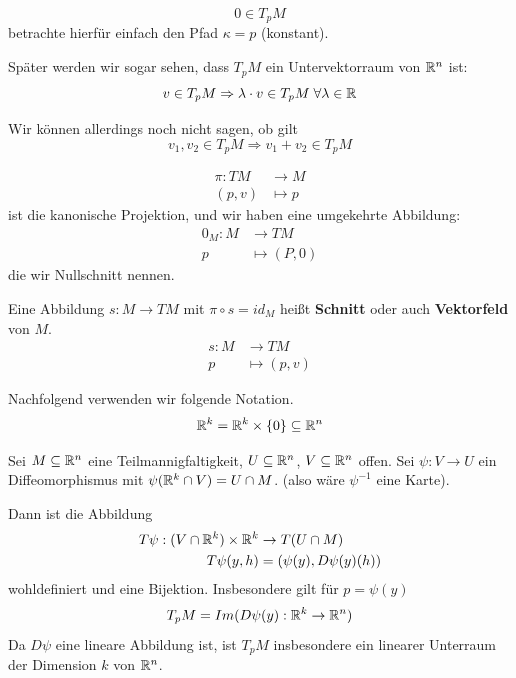 \documentclass[main.tex]{subfiles}
\begin{document}
\begin{Bemerkung}
  $$0 \in T_p M$$
  betrachte hierfür einfach den Pfad $\kappa = p$ (konstant).

  Später werden wir sogar sehen, dass $T_p M$ ein Untervektorraum von $\mathbb{R}^n$ ist:
  $$v \in T_p M \Rightarrow \lambda \cdot v \in T_p M \;\forall \lambda \in \mathbb{R}$$

  Wir können allerdings noch nicht sagen, ob gilt
  $$v_1, v_2\in T_p M \Rightarrow v_1 + v_2 \in T_p M$$
\end{Bemerkung}

\begin{Bemerkung}
  $$\begin{aligned}
    \pi: TM & \to M \\
    (p,v) & \mapsto p
  \end{aligned}$$
  ist die kanonische Projektion, und wir haben eine umgekehrte Abbildung:
  $$\begin{aligned}
    0_M: M & \to TM \\
    p & \mapsto (P,0)
  \end{aligned}$$
  die wir Nullschnitt nennen.
\end{Bemerkung}

\begin{Definition}[Vektorfeld]
  Eine Abbildung $s: M \to T M$ mit $\pi \circ s = id_M$ heißt \textbf{Schnitt} oder auch \textbf{Vektorfeld} von $M$.
  $$\begin{aligned}
    s: M & \to TM \\
    p & \mapsto (p,v)
  \end{aligned}$$
\end{Definition}

Nachfolgend verwenden wir folgende Notation.
$$\mathbb{R}^k = \mathbb{R}^k \times \{0\} \subseteq \mathbb{R}^n$$

\begin{Theorem}
  Sei $M \subseteq \mathbb{R}^n$ eine Teilmannigfaltigkeit, $U \subseteq \mathbb{R}^n$, $V \subseteq \mathbb{R}^n$ offen. Sei $\psi: V \to U$ ein Diffeomorphismus mit $\psi(\mathbb{R}^k \cap V) = U \cap M$. (also wäre $\psi^{-1}$ eine Karte).

  Dann ist die Abbildung
  $$\begin{aligned}
    T \psi: (V \cap \mathbb{R}^k) \times \mathbb{R}^k & \to T(U \cap M) \\
    T\psi(y,h) & = (\psi(y),D\psi(y)(h))
  \end{aligned}$$
  wohldefiniert und eine Bijektion. Insbesondere gilt für $p = \psi(y)$
  $$T_p M = Im(D\psi(y) : \mathbb{R}^k \to \mathbb{R}^n)$$
  Da $D\psi$ eine lineare Abbildung ist, ist $T_p M$ insbesondere ein linearer Unterraum der Dimension $k$ von $\mathbb{R}^n$.
\end{Theorem}
\end{document}

